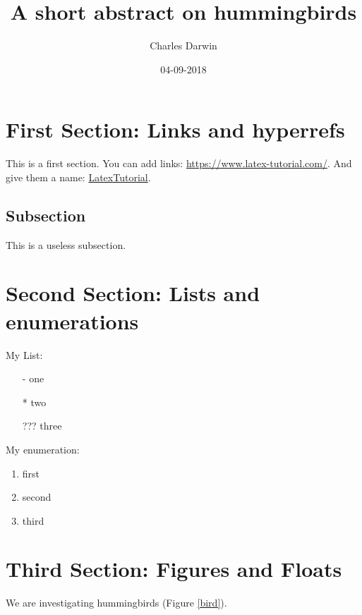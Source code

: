 \documentclass{article}
\title{A short abstract on hummingbirds}
\date{04-09-2018}
\author{Charles Darwin}
\begin{document}
\maketitle
\tableofcontents
\newpage

\doublespacing
\setlength\parindent{0pt}
\section{First Section: Links and hyperrefs}
This is a first section. You can add links: \url{https://www.latex-tutorial.com/}. And give them a name:
\href{https://www.latex-tutorial.com/}{LatexTutorial}.
\subsection{Subsection}
This is a useless subsection.
\section{Second Section: Lists and enumerations}
\begin{minipage}[t]{0.3\textwidth}
\singlespacing
My List:
\begin{itemize}
	\item[-] one
	\item[*] two
	\item[???] three
\end{itemize}
\end{minipage}
\begin{minipage}[t]{0.3\textwidth}
\singlespacing
My enumeration:
\begin{enumerate}
	\item first
	\item second
	\item third
\end{enumerate}

\bigskip
\end{minipage}



\section{Third Section: Figures and Floats}
We are investigating hummingbirds (Figure \ref{bird}).
\end{document}

